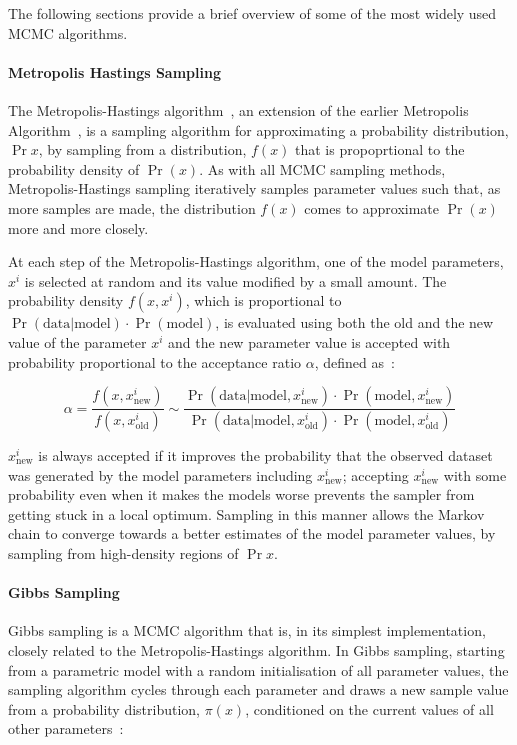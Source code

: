 The following sections provide a brief overview of some of the most widely used MCMC algorithms.  

\paragraph{Metropolis Hastings Sampling}
The Metropolis-Hastings algorithm~\cite{hastings70}, an extension of the earlier Metropolis Algorithm~\cite{metropolis53}, is a sampling algorithm for approximating a probability distribution, $\Pr{x}$, by sampling from a distribution, $f(x)$ that is propoprtional to the probability density of $\Pr(x)$. As with all MCMC sampling methods, Metropolis-Hastings sampling iteratively samples parameter values such that, as more samples are made, the distribution $f(x)$ comes to approximate $\Pr(x)$ more and more closely. 

At each step of the Metropolis-Hastings algorithm, one of the model parameters, $x^i$ is selected at random and its value modified by a small amount. The probability density $f(x, x^i)$, which is proportional to $\Pr(\text{data}|\text{model}) \cdot \Pr(\text{model})$, is evaluated using both the old and the new value of the parameter $x^i$ and the new parameter value is accepted with probability proportional to the acceptance ratio $\alpha$, defined as~\cite{chib95, barberBRML2012}:

\begin{equation}
\alpha =  \frac{f(x, x^i_{\text{new}})}{f(x, x^i_{\text{old}})} \sim \frac{\Pr(\text{data}|\text{model}, x^i_{\text{new}}) \cdot \Pr(\text{model}, x^i_{\text{new}})}{\Pr(\text{data}|\text{model}, x^i_{\text{old}}) \cdot \Pr(\text{model}, x^i_{\text{old}})}
\label{eq:MH_alpha}
\end{equation}

$x^i_{\text{new}}$ is always accepted if it improves the probability that the observed dataset was generated by the model parameters including $x^i_{\text{new}}$; accepting $x^i_{\text{new}}$ with some probability even when it makes the models worse prevents the sampler from getting stuck in a local optimum. Sampling in this manner allows the Markov chain to converge towards a better estimates of the model parameter values, by sampling from high-density regions of $\Pr{x}$.

\paragraph{Gibbs Sampling}
Gibbs sampling is a MCMC algorithm that is, in its simplest implementation, closely related to the Metropolis-Hastings algorithm. In Gibbs sampling, starting from a parametric model with a random initialisation of all parameter values, the sampling algorithm cycles through each parameter and draws a new sample value from a probability distribution, $\pi(x)$, conditioned on the current values of all other parameters~\cite{Smith1993}:


